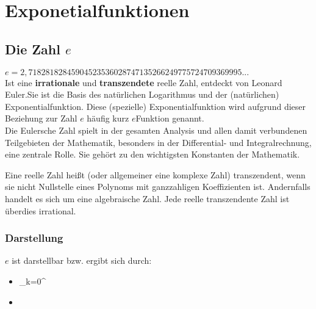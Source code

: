 \chapter{Exponetialfunktionen}
\section{Die Zahl $e$}
\begin{Definition}
$e = 2,71828182845904523536028747135266249775724709369995...$\\
Ist eine \textbf{irrationale} und \textbf{transzendete} reelle Zahl, entdeckt von Leonard Euler.Sie ist die Basis des natürlichen Logarithmus und der (natürlichen) Exponentialfunktion.
Diese (spezielle) Exponentialfunktion wird aufgrund dieser Beziehung zur Zahl $e$ häufig kurz $e$Funktion genannt.\\
Die Eulersche Zahl spielt in der gesamten Analysis und allen damit verbundenen Teilgebieten der Mathematik, besonders in der Differential- und Integralrechnung, eine zentrale Rolle.
Sie gehört zu den wichtigsten Konstanten der Mathematik.
\end{Definition}
\begin{Definition}
  Eine reelle Zahl heißt (oder allgemeiner eine komplexe Zahl) transzendent,
  wenn sie nicht Nullstelle eines Polynoms mit ganzzahligen Koeffizienten ist.
  Andernfalls handelt es sich um eine algebraische Zahl. Jede reelle transzendente Zahl ist überdies irrational.
\end{Definition}
\subsection{Darstellung}
$e$ ist darstellbar bzw. ergibt sich durch:
\begin{itemize}
  \item \sum\limits_{k=0}^{\infty}
  \item
\end{itemize}
